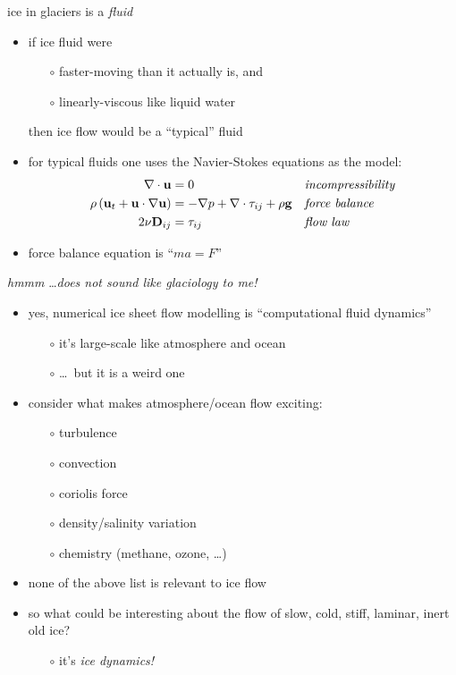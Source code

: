 \begin{frame}{ice in glaciers is a \emph{fluid} }

\begin{itemize}
\item if ice fluid were
  \begin{itemize}
  \item[$\circ$] faster-moving than it actually is, and
  \item[$\circ$] linearly-viscous like liquid water
  \end{itemize}
  
  then ice flow would be a ``typical'' fluid

\bigskip
\item for typical fluids one uses the Navier-Stokes equations as the model:
\begin{align*}
\nabla \cdot \mathbf{u} &= 0 &&\text{\emph{incompressibility}} \\
\rho \left(\mathbf{u}_t + \mathbf{u}\cdot\nabla \mathbf{u}\right) &= -\nabla p + \nabla \cdot \tau_{ij} + \rho \mathbf{g} &&\text{\emph{force balance}} \\
2 \nu \mathbf{D}_{ij} &= \tau_{ij} &&\text{\emph{flow law}}
\end{align*}

\bigskip
\item  force balance equation is ``$m a = F$''
\end{itemize}
\end{frame}


\begin{frame}{\emph{hmmm} \dots \emph{does not sound like glaciology to me!}}

\begin{itemize}
\item \alert{yes}, numerical ice sheet flow modelling is ``computational fluid dynamics''
  \begin{itemize}
  \item[$\circ$] it's large-scale like atmosphere and ocean
  \item[$\circ$] \dots\, but it is a weird one
  \end{itemize}
\item consider what makes atmosphere/ocean flow exciting:
  \begin{itemize}
  \item[$\circ$] turbulence
  \item[$\circ$] convection
  \item[$\circ$] coriolis force
  \item[$\circ$] density/salinity variation
  \item[$\circ$] chemistry (methane, ozone, \dots)
  \end{itemize}
\item none of the above list is relevant to ice flow
\item so what could be interesting about the flow of slow, cold, stiff, laminar, inert old ice?
  \begin{itemize}
  \item[$\circ$] it's \emph{ice dynamics!}
  \end{itemize}
\end{itemize}
\end{frame}


